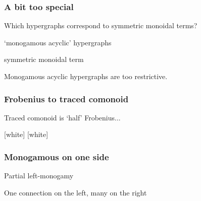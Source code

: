 \begin{frame}
    \frametitle{A bit too special}

    \centering

    Which hypergraphs correspond to \alert{symmetric monoidal} terms?

    \vspace{0.5em}

    \begin{minipage}{0.45\textwidth}
        \begin{center}
            `monogamous acyclic' hypergraphs

            \vspace{1em}

        \end{center}
    \end{minipage}
    \quad
    \raisebox{-1em}{\(\leftrightarrow\)}
    \pause
    \begin{minipage}{0.45\textwidth}
        \begin{center}
            symmetric monoidal term

            \vspace{1em}

        \end{center}
    \end{minipage}

    \vspace{1em}
    \normalsize
    \scalebox{0.75}{\hypergraphpeople}

    \Large
    \pause
    Monogamous acyclic hypergraphs are \alert{too restrictive}.

\end{frame}

\begin{frame}
    \frametitle{Frobenius to traced comonoid}

    \centering
    \LARGE
    Traced comonoid is `half' Frobenius...

    \normalsize

    [white]
    [white]


\end{frame}

\begin{frame}
    \frametitle{Monogamous on one side}

    \centering

    \LARGE
    \alert{Partial left}-monogamy

    \pause
    \normalsize

    One connection on the \alert{left}, many on the \alert{right}



   \end{frame}

